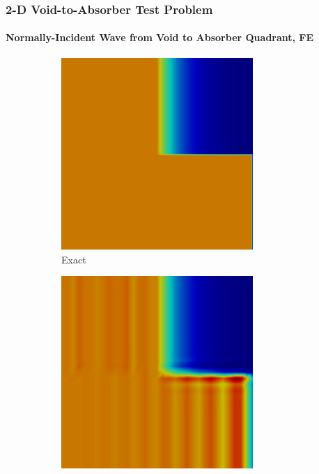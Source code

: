 \begin{frame}
\frametitle{2-D Void-to-Absorber Test Problem}
\framesubtitle{Normally-Incident Wave from Void to Absorber Quadrant, FE}

\begin{figure}[h]
   \centering
   \begin{subfigure}{0.3\textwidth}
      \centering
      \includegraphics[width=0.8\textwidth]{./figures/exact.png}
      \caption{Exact}
   \end{subfigure}
   \begin{subfigure}{0.3\textwidth}
      \centering
      \includegraphics[width=0.8\textwidth]{./figures/Gal.png}

\end{subfigure}
\end{figure}
\end{frame}
